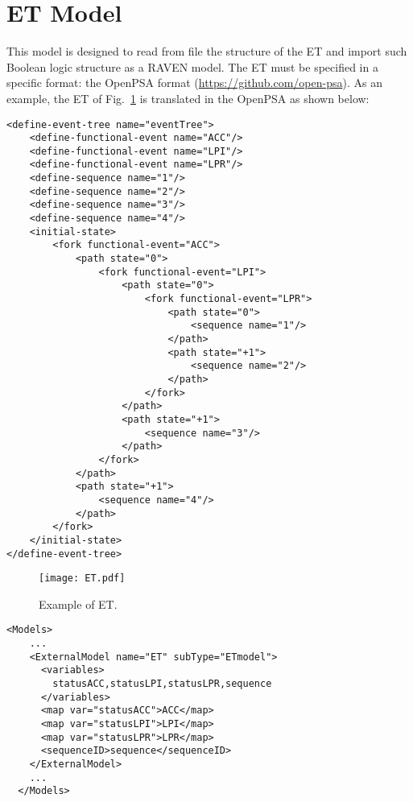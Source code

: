 \section{ET Model}
\label{sec:ETmodel}

This model is designed to read from file the structure of the ET and import such Boolean logic structure as a RAVEN model.
The ET must be specified in a specific format: the OpenPSA format (\href{<url>}{https://github.com/open-psa}). 
As an example, the ET of Fig.~\ref{fig:ET} is translated in the OpenPSA as shown below:

\begin{lstlisting}[style=XML,morekeywords={anAttribute},caption=ETmodel input example., label=lst:ETmodel]
<define-event-tree name="eventTree">
    <define-functional-event name="ACC"/>
    <define-functional-event name="LPI"/>
    <define-functional-event name="LPR"/>
    <define-sequence name="1"/>
    <define-sequence name="2"/>
    <define-sequence name="3"/>
    <define-sequence name="4"/>
    <initial-state>
        <fork functional-event="ACC">
            <path state="0">
                <fork functional-event="LPI">
                    <path state="0">
                        <fork functional-event="LPR">
                            <path state="0">
                                <sequence name="1"/>
                            </path>
                            <path state="+1">
                                <sequence name="2"/>
                            </path>
                        </fork>
                    </path>
                    <path state="+1">
                        <sequence name="3"/>
                    </path>
                </fork>
            </path>
            <path state="+1">
                <sequence name="4"/>
            </path>
        </fork>
    </initial-state>
</define-event-tree>
\end{lstlisting} 

\begin{figure}
    \centering
    \centerline{\texttt{[image: ET.pdf]}} 
    \caption{Example of ET.}
    \label{fig:ET}
\end{figure}

\begin{lstlisting}[style=XML,morekeywords={anAttribute},caption=ET model input example., label=lst:ET_InputExample]
  <Models> 
    ...
    <ExternalModel name="ET" subType="ETmodel">
      <variables>
        statusACC,statusLPI,statusLPR,sequence
      </variables>
      <map var="statusACC">ACC</map>
      <map var="statusLPI">LPI</map>
      <map var="statusLPR">LPR</map>
      <sequenceID>sequence</sequenceID>
    </ExternalModel>
    ...
  </Models>
\end{lstlisting}

